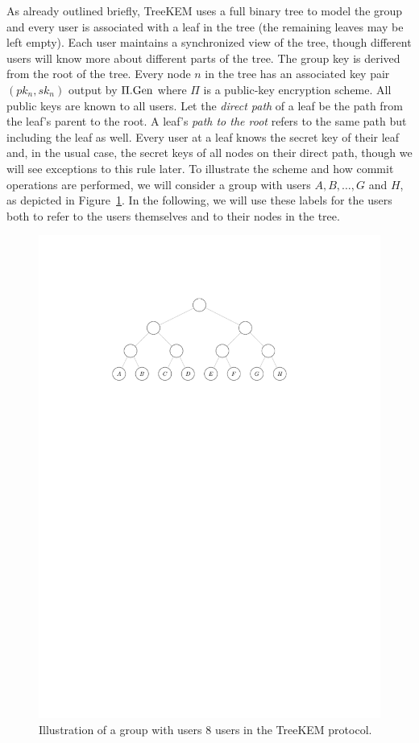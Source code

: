 As already outlined briefly, TreeKEM uses a full binary tree to model the group and every user is associated with a leaf in the tree (the remaining leaves may be left empty). Each user maintains a synchronized view of the tree, though different users will know more about different parts of the tree. The group key is derived from the root of the tree. Every node $n$ in the tree has an associated key pair $(pk_n, sk_n)$ output by $\Pi.\mathrm{Gen}$ where $\Pi$ is a public-key encryption scheme. All public keys are known to all users. Let the \emph{direct path} of a leaf be the path from the leaf's parent to the root. A leaf's \emph{path to the root} refers to the same path but including the leaf as well. Every user at a leaf knows the secret key of their leaf and, in the usual case, the secret keys of all nodes on their direct path, though we will see exceptions to this rule later. To illustrate the scheme and how commit operations are performed, we will consider a group with users $A, B, \ldots, G$ and $H$, as depicted in Figure~\ref{fig:treekem-tree}. In the following, we will use these labels for the users both to refer to the users themselves and to their nodes in the tree.

\begin{figure}
	\begin{center}
		\includegraphics{figures/treekem-tree}
	\end{center}
	\caption{Illustration of a group with users 8 users in the TreeKEM protocol.}\label{fig:treekem-tree}
\end{figure}


